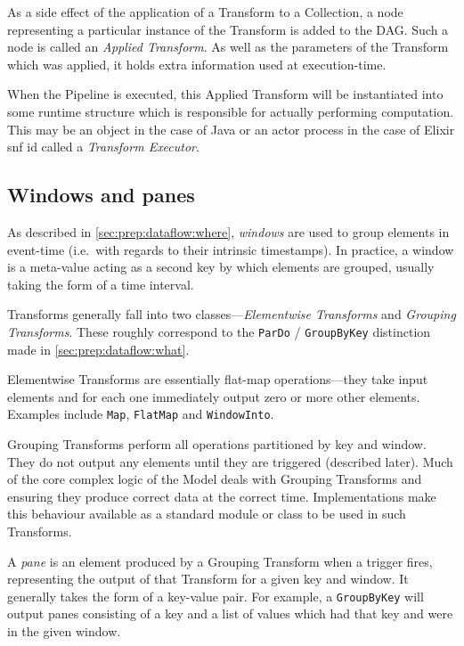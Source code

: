 As a side effect of the application of a Transform to a Collection, a node representing a particular instance of the Transform is added to the DAG.
Such a node is called an \emph{Applied Transform}.
As well as the parameters of the Transform which was applied, it holds extra information used at execution-time.

When the Pipeline is executed, this Applied Transform will be instantiated into some runtime structure which is responsible for actually performing computation.
This may be an object in the case of Java or an actor process in the case of Elixir snf id called a \emph{Transform Executor}.

\subsection{Windows and panes}\label{sec:impl:dataflow:windows-panes}

As described in \cref{sec:prep:dataflow:where}, \emph{windows} are used to group elements in event-time (i.e.\ with regards to their intrinsic timestamps).
In practice, a window is a meta-value acting as a second key by which elements are grouped, usually taking the form of a time interval.

Transforms generally fall into two classes---\emph{Elementwise Transforms} and \emph{Grouping Transforms}.
These roughly correspond to the \verb|ParDo| / \verb|GroupByKey| distinction made in \cref{sec:prep:dataflow:what}.

Elementwise Transforms are essentially flat-map operations---they take input elements and for each one immediately output zero or more other elements.
Examples include \verb|Map|, \verb|FlatMap| and \verb|WindowInto|.

Grouping Transforms perform all operations partitioned by key and window.
They do not output any elements until they are triggered (described later).
Much of the core complex logic of the Model deals with Grouping Transforms and ensuring they produce correct data at the correct time.
Implementations make this behaviour available as a standard module or class to be used in such Transforms.

A \emph{pane} is an element produced by a Grouping Transform when a trigger fires, representing the output of that Transform for a given key and window.
It generally takes the form of a key-value pair.
For example, a \verb|GroupByKey| will output panes consisting of a key and a list of values which had that key and were in the given window.

